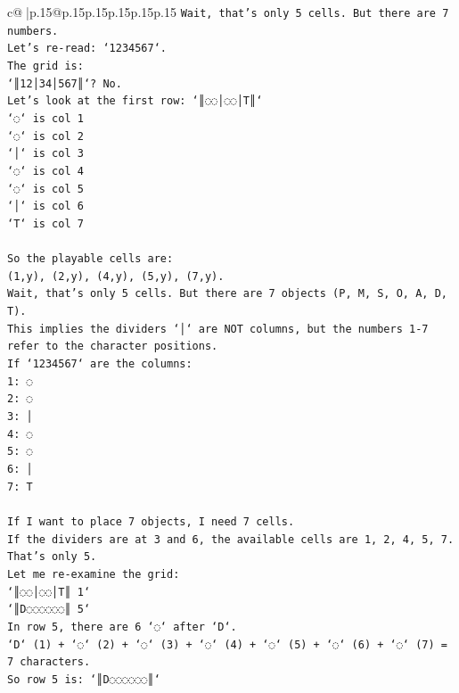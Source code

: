 \documentclass{article}
\begin{document}
{\begin{supertabular}{c@{$\;$}|p{.15\linewidth}@{}p{.15\linewidth}p{.15\linewidth}p{.15\linewidth}p{.15\linewidth}p{.15\linewidth}}
{{{\texttt{Wait, that's only 5 cells. But there are 7 numbers.} \\
\texttt{Let's re{-}read: `1234567`.} \\
\texttt{The grid is:} \\
\texttt{`║12│34│567║`? No.} \\
\texttt{Let's look at the first row: `║◌◌│◌◌│T║`} \\
\texttt{`◌` is col 1} \\
\texttt{`◌` is col 2} \\
\texttt{`│` is col 3} \\
\texttt{`◌` is col 4} \\
\texttt{`◌` is col 5} \\
\texttt{`│` is col 6} \\
\texttt{`T` is col 7} \\
\\ 
\texttt{So the playable cells are:} \\
\texttt{(1,y), (2,y), (4,y), (5,y), (7,y).} \\
\texttt{Wait, that's only 5 cells. But there are 7 objects (P, M, S, O, A, D, T).} \\
\texttt{This implies the dividers `│` are NOT columns, but the numbers 1{-}7 refer to the character positions.} \\
\texttt{If `1234567` are the columns:} \\
\texttt{1: ◌} \\
\texttt{2: ◌} \\
\texttt{3: │} \\
\texttt{4: ◌} \\
\texttt{5: ◌} \\
\texttt{6: │} \\
\texttt{7: T} \\
\\ 
\texttt{If I want to place 7 objects, I need 7 cells.} \\
\texttt{If the dividers are at 3 and 6, the available cells are 1, 2, 4, 5, 7. That's only 5.} \\
\texttt{Let me re{-}examine the grid:} \\
\texttt{`║◌◌│◌◌│T║ 1`} \\
\texttt{`║D◌◌◌◌◌◌║ 5`} \\
\texttt{In row 5, there are 6 `◌` after `D`.} \\
\texttt{`D` (1) + `◌` (2) + `◌` (3) + `◌` (4) + `◌` (5) + `◌` (6) + `◌` (7) = 7 characters.} \\
\texttt{So row 5 is: `║D◌◌◌◌◌◌║`} \\
}}}
\end{supertabular}}
\end{document}
